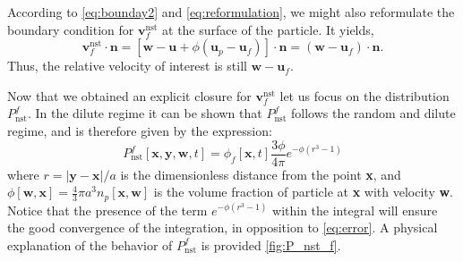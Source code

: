 According to \ref{eq:bounday2} and \ref{eq:reformulation}, we might also reformulate the boundary condition for $\textbf{v}^\text{nst}_f$ at the surface of the particle. 
It yields, 
\begin{equation*}
    \textbf{v}^\text{nst}_f\cdot \textbf{n}
    = \left[
        \textbf{w} - \textbf{u} + \phi (\textbf{u}_p - \textbf{u}_f)
    \right]\cdot \textbf{n}
    = \left(
        \textbf{w} - \textbf{u}_f
    \right)\cdot \textbf{n}.
\end{equation*}
Thus, the relative velocity of interest is still $\textbf{w} - \textbf{u}_f$. 

Now that we obtained an explicit closure for $\textbf{v}^\text{nst}_f$ let us focus 
on the distribution $P_\text{nst}^f$. 
In the dilute regime it can be shown that $P_\text{nst}^f$ follows the random and dilute regime, and is therefore given by the expression\citep{zhang2021ensemble}: 
\begin{equation}
    P_\text{nst}^f[\textbf{x},\textbf{y},\textbf{w},t]
    = \phi_f[\textbf{x},t] \frac{3\phi}{4\pi} e^{-\phi(r^3 -1)}
    \label{eq:Pnst_explicit}
\end{equation} 
where $r = |\textbf{y} - \textbf{x}|/a$ is the dimensionless distance from the point \textbf{x},  and $\phi[\textbf{w},\textbf{x}] = \frac{4}{3}\pi a^3 n_p[\textbf{x},\textbf{w}]$ is the volume fraction of particle at \textbf{x} with velocity \textbf{w}. 
Notice that the presence of the term $e^{-\phi(r^3 -1)}$ within the integral will ensure the good convergence of the integration, in opposition to \ref{eq:error}. 
A physical explanation of the behavior of $P_\text{nst}^f$ is provided \ref{fig:P_nst_f}. 
